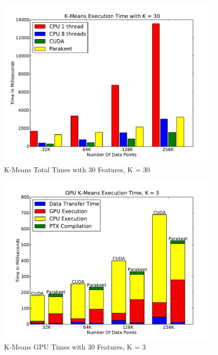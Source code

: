 \documentclass[preprint]{sigplanconf}
\begin{document}
\begin{figure}
\includegraphics[scale=0.45]{KMCPUK30.pdf}
\caption{K-Means Total Times with 30 Features, K = 30}
\label{KMCPU30}
\end{figure}

\begin{figure}
\includegraphics[scale=0.45]{KMGPU.pdf}
\caption{K-Means GPU Times with 30 Features, K = 3}
\label{KMGPU}
\end{figure}
\end{document}
